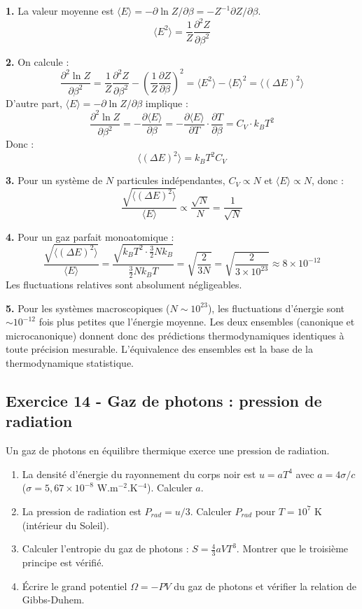 \documentclass[12pt,a4paper]{article}
\begin{document}
\begin{boitecorrige}
\textbf{1.} La valeur moyenne est $\langle E\rangle = -\partial\ln Z/\partial\beta = -Z^{-1}\partial Z/\partial\beta$.
\[
\langle E^2\rangle = \frac{1}{Z}\frac{\partial^2 Z}{\partial\beta^2}
\]

\textbf{2.} On calcule :
\[
\frac{\partial^2\ln Z}{\partial\beta^2} = \frac{1}{Z}\frac{\partial^2 Z}{\partial\beta^2} - \left(\frac{1}{Z}\frac{\partial Z}{\partial\beta}\right)^2 = \langle E^2\rangle - \langle E\rangle^2 = \langle(\Delta E)^2\rangle
\]
D'autre part, $\langle E\rangle = -\partial\ln Z/\partial\beta$ implique :
\[
\frac{\partial^2\ln Z}{\partial\beta^2} = -\frac{\partial\langle E\rangle}{\partial\beta} = -\frac{\partial\langle E\rangle}{\partial T}\cdot\frac{\partial T}{\partial\beta} = C_V\cdot k_BT^2
\]
Donc :
\[
\boxed{\langle(\Delta E)^2\rangle = k_BT^2 C_V}
\]

\textbf{3.} Pour un système de $N$ particules indépendantes, $C_V\propto N$ et $\langle E\rangle\propto N$, donc :
\[
\frac{\sqrt{\langle(\Delta E)^2\rangle}}{\langle E\rangle}\propto\frac{\sqrt{N}}{N} = \frac{1}{\sqrt{N}}
\]

\textbf{4.} Pour un gaz parfait monoatomique :
\[
\frac{\sqrt{\langle(\Delta E)^2\rangle}}{\langle E\rangle} = \frac{\sqrt{k_BT^2\cdot\frac{3}{2}Nk_B}}{\frac{3}{2}Nk_BT} = \sqrt{\frac{2}{3N}} = \sqrt{\frac{2}{3\times10^{23}}}\approx 8\times10^{-12}
\]
Les fluctuations relatives sont absolument négligeables.

\textbf{5.} Pour les systèmes macroscopiques ($N\sim10^{23}$), les fluctuations d'énergie sont $\sim10^{-12}$ fois plus petites que l'énergie moyenne. Les deux ensembles (canonique et microcanonique) donnent donc des prédictions thermodynamiques identiques à toute précision mesurable. L'équivalence des ensembles est la base de la thermodynamique statistique.
\end{boitecorrige}

\subsection*{Exercice 14 - Gaz de photons : pression de radiation \niveau{\difficile}}

\begin{boiteexercice}
Un gaz de photons en équilibre thermique exerce une pression de radiation.
\begin{enumerate}
  \item La densité d'énergie du rayonnement du corps noir est $u = aT^4$ avec $a = 4\sigma/c$ ($\sigma = 5{,}67\times10^{-8}$ W.m$^{-2}$.K$^{-4}$). Calculer $a$.
  \item La pression de radiation est $P_{rad} = u/3$. Calculer $P_{rad}$ pour $T = 10^7$ K (intérieur du Soleil).
  \item Calculer l'entropie du gaz de photons : $S = \frac{4}{3}aVT^3$. Montrer que le troisième principe est vérifié.
  \item Écrire le grand potentiel $\Omega = -PV$ du gaz de photons et vérifier la relation de Gibbs-Duhem.
\end{enumerate}
\end{boiteexercice}
\end{document}
